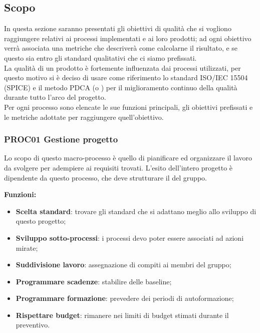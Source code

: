 \documentclass[../piano_di_qualifica.tex]{subfiles}
\begin{document}
\subsection{Scopo}
In questa sezione saranno presentati gli obiettivi di qualità che si vogliono raggiungere relativi ai processi implementati e ai loro prodotti; ad ogni obiettivo verrà associata una metriche che descriverà come calcolarne il risultato, e se questo sia entro gli standard qualitativi che ci siamo prefissati.\\
La qualità di un prodotto è fortemente influenzata dai processi utilizzati, per questo motivo si è deciso di usare come riferimento lo standard ISO/IEC 15504 (SPICE)  e il metodo PDCA (o ) per il miglioramento continuo della qualità durante tutto l'arco del progetto.\\
Per ogni processo sono elencate le sue funzioni principali, gli obiettivi prefissati e le metriche adottate per raggiungere quell’obiettivo.

\subsubsection{PROC01 Gestione progetto}
Lo scopo di questo macro-processo è quello di pianificare ed organizzare il lavoro da svolgere per adempiere ai requisiti trovati. L'esito dell'intero progetto è dipendente da questo processo, che deve strutturare il  del gruppo.

\setlength{\parindent}{0pt}\textbf{Funzioni:}
\smallbreak
\begin{itemize}
	\item \textbf{Scelta standard}: trovare gli standard che si adattano meglio allo sviluppo di questo progetto;
	\item \textbf{Sviluppo sotto-processi}: i processi devo poter essere associati ad azioni mirate;
	\item \textbf{Suddivisione lavoro}: assegnazione di compiti ai membri del gruppo;
	\item \textbf{Programmare scadenze}: stabilire delle baseline;
	\item \textbf{Programmare formazione}: prevedere dei periodi di autoformazione;
	\item \textbf{Rispettare budget}: rimanere nei limiti di budget stimati durante il preventivo.
\end{itemize}
\end{document}
